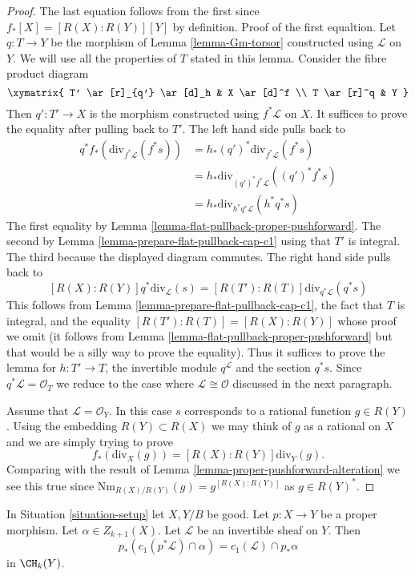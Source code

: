 \begin{proof}
The last equation follows from the first since $f_*[X] = [R(X) : R(Y)][Y]$ by
definition. Proof of the first equaltion. Let $q : T \to Y$ be the morphism of
Lemma \ref{lemma-Gm-torsor} constructed using $\mathcal{L}$ on $Y$. We will use
all the properties of $T$ stated in this lemma. Consider the fibre product
diagram
$$
\xymatrix{
T' \ar[r]_{q'} \ar[d]_h & X \ar[d]^f \\
T \ar[r]^q & Y
}
$$
Then $q' : T' \to X$ is the morphism constructed using $f^*\mathcal{L}$
on $X$. It suffices to prove the equality after pulling back to $T'$.
The left hand side pulls back to
\begin{align*}
q^*f_*\left(\text{div}_{f^*\mathcal{L}}(f^*s)\right)
& =
h_*(q')^*\text{div}_{f^*\mathcal{L}}(f^*s) \\
& =
h_*\text{div}_{(q')^*f^*\mathcal{L}}((q')^*f^*s) \\
& =
h_*\text{div}_{h^*q^*\mathcal{L}}(h^*q^*s)
\end{align*}
The first equality by Lemma \ref{lemma-flat-pullback-proper-pushforward}.
The second by Lemma \ref{lemma-prepare-flat-pullback-cap-c1}
using that $T'$ is integral. The third because the displayed diagram commutes.
The right hand side pulls back to
$$
[R(X) : R(Y)]q^*\text{div}_\mathcal{L}(s) =
[R(T') : R(T)]\text{div}_{q^*\mathcal{L}}(q^*s)
$$
This follows from Lemma \ref{lemma-prepare-flat-pullback-cap-c1},
the fact that $T$ is integral, and the equality
$[R(T') : R(T)] = [R(X) : R(Y)]$ whose proof we omit
(it follows from Lemma \ref{lemma-flat-pullback-proper-pushforward}
but that would be a silly way to prove the equality).
Thus it suffices to prove the lemma for $h : T' \to T$, the
invertible module $q^\mathcal{L}$ and the section $q^*s$.
Since $q^*\mathcal{L} = \mathcal{O}_T$
we reduce to the case where $\mathcal{L} \cong \mathcal{O}$
discussed in the next paragraph.

\medskip\noindent
Assume that $\mathcal{L} = \mathcal{O}_Y$. In this case $s$
corresponds to a rational function $g \in R(Y)$. Using the
embedding $R(Y) \subset R(X)$ we may think of $g$ as a rational
on $X$ and we are simply trying to prove
$$
f_*\left(\text{div}_X(g)\right) = [R(X) : R(Y)]\text{div}_Y(g).
$$
Comparing with the result of Lemma \ref{lemma-proper-pushforward-alteration}
we see this true since $\text{Nm}_{R(X)/R(Y)}(g) = g^{[R(X) : R(Y)]}$
as $g \in R(Y)^*$.
\end{proof}

\begin{lemma}
\label{lemma-pushforward-cap-c1}
In Situation \ref{situation-setup} let $X, Y/B$ be good.
Let $p : X \to Y$ be a proper morphism.
Let $\alpha \in Z_{k + 1}(X)$.
Let $\mathcal{L}$ be an invertible sheaf on $Y$.
Then
$$
p_*(c_1(p^*\mathcal{L}) \cap \alpha) = c_1(\mathcal{L}) \cap p_*\alpha
$$
in $\CH_k(Y)$.
\end{lemma}

